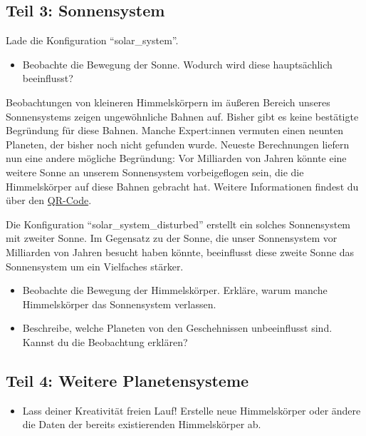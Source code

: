 \documentclass{scrartcl}
\begin{document}
        \subsection*{Teil 3: Sonnensystem}
        Lade die Konfiguration "`solar\_system"'.
        \begin{itemize}
            \item Beobachte die Bewegung der Sonne. Wodurch wird diese hauptsächlich beeinflusst? 
        \end{itemize}
        Beobachtungen von kleineren Himmelskörpern im äußeren Bereich unseres Sonnensystems zeigen ungewöhnliche Bahnen auf.
        Bisher gibt es keine bestätigte Begründung für diese Bahnen. 
        Manche Expert:innen vermuten einen neunten Planeten, der bisher noch nicht gefunden wurde.
        Neueste Berechnungen liefern nun eine andere mögliche Begründung:
        Vor Milliarden von Jahren könnte eine weitere Sonne an unserem Sonnensystem vorbeigeflogen sein, die die Himmelskörper auf diese Bahnen gebracht hat.
        Weitere Informationen findest du über den \href{https://www.fr.de/wissen/simulationen-aus-deutschland-zeigen-planet-koennte-etwas-ganz-anderes-sein-zr-93300641.html}{QR-Code}.
        \begin{flushright}
        \end{flushright}

        \noindent Die Konfiguration "`solar\_system\_disturbed"' erstellt ein solches Sonnensystem mit zweiter Sonne.
        Im Gegensatz zu der Sonne, die unser Sonnensystem vor Milliarden von Jahren besucht haben könnte, beeinflusst diese zweite Sonne das Sonnensystem um ein Vielfaches stärker.
        \begin{itemize}
            \item Beobachte die Bewegung der Himmelskörper. Erkläre, warum manche Himmelskörper das Sonnensystem verlassen.
            \item Beschreibe, welche Planeten von den Geschehnissen unbeeinflusst sind. Kannst du die Beobachtung erklären?
        \end{itemize}
        

        \subsection*{Teil 4: Weitere Planetensysteme}
        \begin{itemize}
        \item Lass deiner Kreativität freien Lauf! Erstelle neue Himmelskörper oder ändere die Daten der bereits existierenden Himmelskörper ab.
        \end{itemize}
\end{document}
